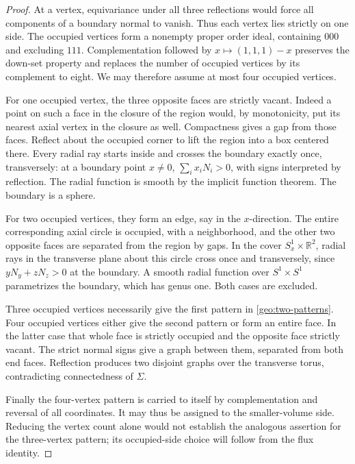\begin{proof}
At a vertex, equivariance under all three reflections would force all
components of a boundary normal to vanish. Thus each vertex lies strictly
on one side. The occupied vertices form a nonempty proper order ideal,
containing \(000\) and excluding \(111\).
Complementation followed by \(x\mapsto(1,1,1)-x\) preserves the down-set
property and replaces the number of occupied vertices by its complement
to eight. We may therefore assume at most four occupied vertices.

For one occupied vertex, the three opposite faces are strictly vacant.
Indeed a point on such a face in the closure of the region would, by
monotonicity, put its nearest axial vertex in the closure as well.
Compactness gives a gap from those faces. Reflect about the occupied
corner to lift the region into a box centered there. Every radial ray
starts inside and crosses the boundary exactly once, transversely:
at a boundary point \(x\ne0\),
\(\sum_i x_iN_i>0\), with signs interpreted by reflection.
The radial function is smooth by the implicit function theorem.
The boundary is a sphere.

For two occupied vertices, they form an edge, say in the \(x\)-direction.
The entire corresponding axial circle is occupied, with a neighborhood,
and the other two opposite faces are separated from the region by gaps.
In the cover \(S^1_x\times\mathbb R^2\), radial rays in the transverse
plane about this circle cross once and transversely, since
\(yN_y+zN_z>0\) at the boundary. A smooth radial function over
\(S^1\times S^1\) parametrizes the boundary, which has genus one.
Both cases are excluded.

Three occupied vertices necessarily give the first pattern in
\eqref{geo:two-patterns}. Four occupied vertices either give the second
pattern or form an entire face. In the latter case that whole face is
strictly occupied and the opposite face strictly vacant. The strict
normal signs give a graph between them, separated from both end faces.
Reflection produces two disjoint graphs over the transverse torus,
contradicting connectedness of \(\Sigma\).

Finally the four-vertex pattern is carried to itself by complementation
and reversal of all coordinates. It may thus be assigned to the
smaller-volume side. Reducing the vertex count alone would not establish
the analogous assertion for the three-vertex pattern; its occupied-side
choice will follow from the flux identity.
\end{proof}



